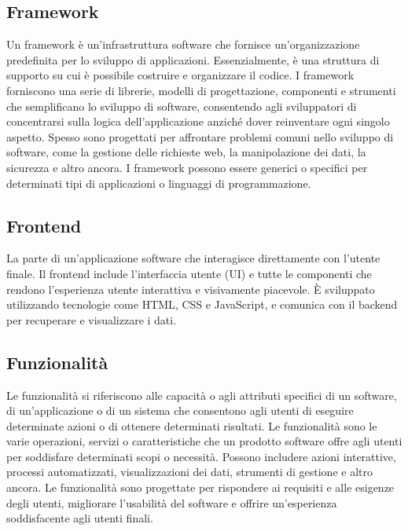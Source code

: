 \subsection*{Framework} 
Un framework è un'infrastruttura software che fornisce un'organizzazione predefinita per lo sviluppo di applicazioni. Essenzialmente, è una struttura di supporto su cui è possibile costruire e organizzare il codice. I framework forniscono una serie di librerie, modelli di progettazione, componenti e strumenti che semplificano lo sviluppo di software, consentendo agli sviluppatori di concentrarsi sulla logica dell'applicazione anziché dover reinventare ogni singolo aspetto. Spesso sono progettati per affrontare problemi comuni nello sviluppo di software, come la gestione delle richieste web, la manipolazione dei dati, la sicurezza e altro ancora. I framework possono essere generici o specifici per determinati tipi di applicazioni o linguaggi di programmazione.
\subsection*{Frontend} 
La parte di un'applicazione software che interagisce direttamente con l'utente finale. Il frontend include l'interfaccia utente (UI) e tutte le componenti che rendono l'esperienza utente interattiva e visivamente piacevole. È sviluppato utilizzando tecnologie come HTML, CSS e JavaScript, e comunica con il backend per recuperare e visualizzare i dati.
\subsection*{Funzionalità} 
Le funzionalità si riferiscono alle capacità o agli attributi specifici di un software, di un'applicazione o di un sistema che consentono agli utenti di eseguire determinate azioni o di ottenere determinati risultati. Le funzionalità sono le varie operazioni, servizi o caratteristiche che un prodotto software offre agli utenti per soddisfare determinati scopi o necessità. Possono includere azioni interattive, processi automatizzati, visualizzazioni dei dati, strumenti di gestione e altro ancora. Le funzionalità sono progettate per rispondere ai requisiti e alle esigenze degli utenti, migliorare l'usabilità del software e offrire un'esperienza soddisfacente agli utenti finali.
